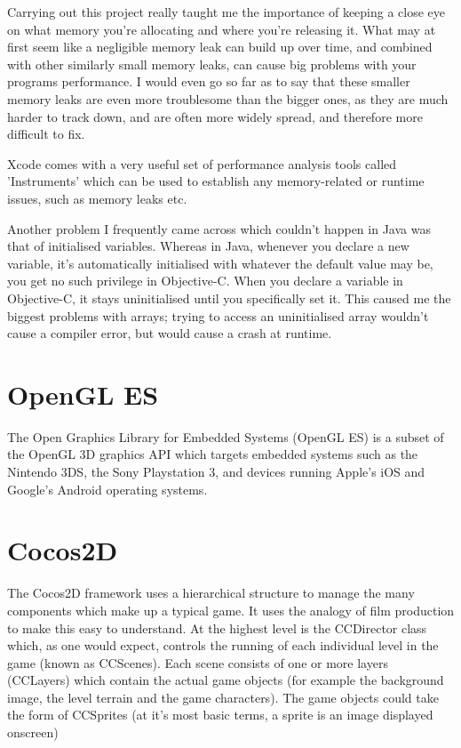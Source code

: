 \documentclass[a4paper,oneside]{report}
\begin{document}
Carrying out this project really taught me the importance of keeping a close eye on what memory you're allocating and where you're releasing it. What may at first seem like a negligible memory leak can build up over time, and combined with other similarly small memory leaks, can cause big problems with your programs performance. I would even go so far as to say that these smaller memory leaks are even more troublesome than the bigger ones, as they are much harder to track down, and are often more widely spread, and therefore more difficult to fix.

Xcode comes with a very useful set of performance analysis tools called 'Instruments' which can be used to establish any memory-related or runtime issues, such as memory leaks etc.

Another problem I frequently came across which couldn't happen in Java was that of initialised variables. Whereas in Java, whenever you declare a new variable, it's automatically initialised with whatever the default value may be, you get no such privilege in Objective-C. When you declare a variable in Objective-C, it stays uninitialised until you specifically set it. This caused me the biggest problems with arrays; trying to access an uninitialised array wouldn't cause a compiler error, but would cause a crash at runtime.


\section{OpenGL ES} The Open Graphics Library for Embedded Systems (OpenGL ES) is a subset of the OpenGL 3D graphics API which targets embedded systems such as the Nintendo 3DS, the Sony Playstation 3, and devices running Apple's iOS and Google's Android operating systems.

\section{Cocos2D} The Cocos2D framework uses a hierarchical structure to manage the many components which make up a typical game. It uses the analogy of film production to make this easy to understand. At the highest level is the CCDirector class which, as one would expect, controls the running of each individual level in the game (known as CCScenes). Each scene consists of one or more  layers (CCLayers) which contain the actual game objects (for example the background image, the level terrain and the game characters). The game objects could take the form of CCSprites (at it's most basic terms, a sprite is an image displayed onscreen)
\end{document}
